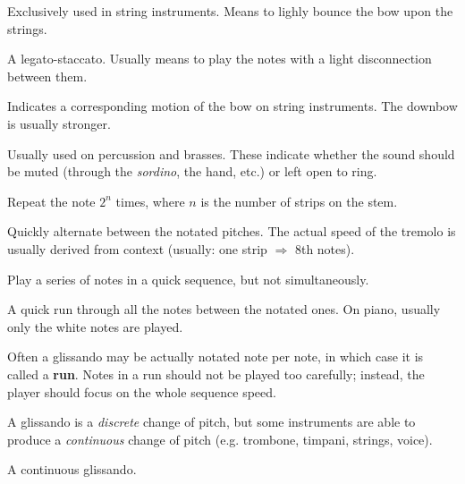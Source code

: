 \begin{definition}[Spiccato]
    Exclusively used in string instruments. Means to lighly bounce the bow upon the strings.
\end{definition}

\begin{definition}[Portato]
    A legato-staccato. Usually means to play the notes with a light disconnection between them.
\end{definition}

\begin{definition}
    Indicates a corresponding motion of the bow on string instruments. The downbow is usually stronger.
\end{definition}

\begin{definition}
    Usually used on percussion and brasses. These indicate whether the sound should be muted (through the \emph{sordino}, the hand, etc.) or left open to ring.
\end{definition}

\begin{definition}
    Repeat the note $2^n$ times, where $n$ is the number of strips on the stem.
\end{definition}

\begin{definition}
    Quickly alternate between the notated pitches. The actual speed of the tremolo is usually derived from context (usually: one strip $\Rightarrow$ 8th notes).
\end{definition}

\begin{definition}[Arpeggio]
    Play a series of notes in a quick sequence, but not simultaneously.
\end{definition}

\begin{definition}[Glissando]
    A quick run through all the notes between the notated ones. On piano, usually only the white notes are played.
\end{definition}

Often a glissando may be actually notated note per note, in which case it is called a \textbf{run}. Notes in a run should not be played too carefully; instead, the player should focus on the whole sequence speed.

A glissando is a \emph{discrete} change of pitch, but some instruments are able to produce a \emph{continuous} change of pitch (e.g. trombone, timpani, strings, voice).

\begin{definition}[Portamento]
    A continuous glissando.
\end{definition}